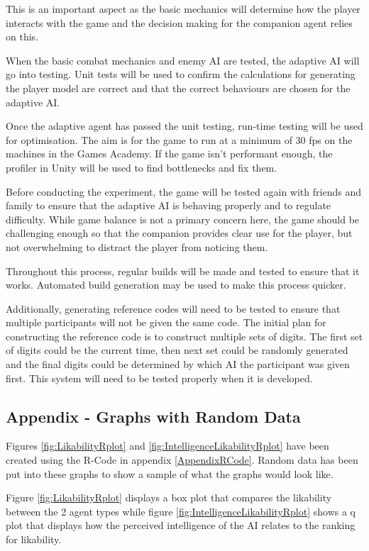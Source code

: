 \documentclass{IEEEtran}
\begin{document}
This is an important aspect as the basic mechanics will determine how the player interacts with the game and the decision making for the companion agent relies on this.

When the basic combat mechanics and enemy AI are tested, the adaptive AI will go into testing. Unit tests will be used to confirm the calculations for generating the player model are correct and that the correct behaviours are chosen for the adaptive AI.

Once the adaptive agent has passed the unit testing, run-time testing will be used for optimisation. The aim is for the game to run at a minimum of 30 fps on the machines in the Games Academy. If the game isn't performant enough, the profiler in Unity will be used to find bottlenecks and fix them.

Before conducting the experiment, the game will be tested again with friends and family to ensure that the adaptive AI is behaving properly and to regulate difficulty. While game balance is not a primary concern here, the game should be challenging enough so that the companion provides clear use for the player, but not overwhelming to distract the player from noticing them.

Throughout this process, regular builds will be made and tested to ensure that it works. Automated build generation may be used to make this process quicker.

Additionally, generating reference codes will need to be tested to ensure that multiple participants will not be given the same code. The initial plan for constructing the reference code is to construct multiple sets of digits. The first set of digits could be the current time, then next set could be randomly generated and the final digits could be determined by which AI the participant was given first. This system will need to be tested properly when it is developed.

\subsection{Appendix - Graphs with Random Data}

Figures \ref{fig:LikabilityRplot} and \ref{fig:IntelligenceLikabilityRplot} have been created using the R-Code in appendix \ref{AppendixRCode}. Random data has been put into these graphs to show a sample of what the graphs would look like.

Figure \ref{fig:LikabilityRplot} displays a box plot that compares the likability between the 2 agent types while figure \ref{fig:IntelligenceLikabilityRplot} shows a q plot that displays how the perceived intelligence of the AI relates to the ranking for likability.
\end{document}

